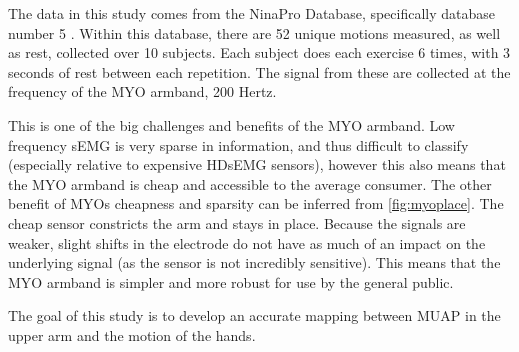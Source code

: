 The data in this study comes from the NinaPro Database, specifically database number 5 \cite{nina5}. Within this database, there are 52 unique motions measured, as well as rest, collected over 10 subjects. Each subject does each exercise 6 times, with 3 seconds of rest between each repetition. The signal from these are collected at the frequency of the MYO armband, 200 Hertz. 
\par This is one of the big challenges and benefits of the MYO armband. Low frequency sEMG is very sparse in information, and thus difficult to classify (especially relative to expensive HDsEMG sensors), however this also means that the MYO armband is cheap and accessible to the average consumer. The other benefit of MYOs cheapness and sparsity can be inferred from \autoref{fig:myoplace}. The cheap sensor constricts the arm and stays in place. Because the signals are weaker, slight shifts in the electrode do not have as much of an impact on the underlying signal (as the sensor is not incredibly sensitive). This means that the MYO armband is simpler and more robust for use by the general public.\par

The goal of this study is to develop an accurate mapping between MUAP in the upper arm and the motion of the hands.

